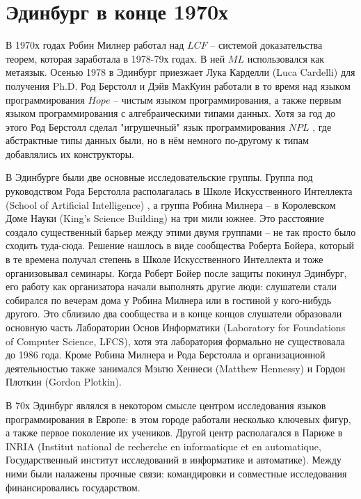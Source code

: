 \documentclass[14pt]{matmex-diploma-custom}
\begin{document}
\section{Эдинбург в конце 1970х}
В 1970х годах Робин Милнер работал над $LCF$ -- системой доказательства теорем, которая заработала в 1978-79х годах. В ней $M\!L$ использовался как метаязык. 
Осенью 1978 в Эдинбург приезжает Лука Карделли (Luca Cardelli) для получения Ph.D. Род Берстолл и Дэйв МакКуин работали в то время над языком программирования $Hope$ \cite{hope1} -- чистым языком программирования, а также первым языком программирования с алгебраическими типами данных. Хотя за год до этого Род Берстолл сделал "игрушечный" язык программирования $N\!P\!L$ \cite{npl1}, где абстрактные типы данных были, но в нём немного по-другому к типам добавлялись их конструкторы.

В Эдинбурге были две основные исследовательские группы. Группа под руководством Рода Берстолла располагалась в Школе Искусственного Интеллекта (School of Artificial Intelligence) 
, а группа Робина Милнера -- в Королевском Доме Науки (King’s Science Building) на три мили южнее. Это расстояние создало существенный барьер между этими двумя группами -- не так просто было сходить туда-сюда. Решение нашлось в виде сообщества Роберта Бойера, который в те времена получал степень в Школе Искусственного Интеллекта и тоже организовывал семинары.
Когда Роберт Бойер после защиты покинул Эдинбург, его работу как организатора начали выполнять другие люди: слушатели стали  собирался по вечерам дома у Робина Милнера  или в гостиной у кого-нибудь другого. Это сблизило два сообщества и в конце концов слушатели образовали основную часть Лаборатории Основ Информатики (Laboratory for Foundations of Computer Science, LFCS), хотя эта лаборатория формально не существовала до 1986 года.  Кроме Робина Милнера и Рода Берстолла и организационной деятельностью также занимался Мэьтю Хеннеси (Matthew Hennessy) и Гордон Плоткин (Gordon Plotkin).

В 70х Эдинбург являлся в некотором смысле центром исследования языков программирования в Европе: в этом городе работали несколько ключевых фигур, а также первое поколение их учеников. Другой центр располагался в Париже в INRIA (Institut national de recherche en informatique et en automatique, Государственный институт исследований в информатике и автоматике). Между ними были налажены прочные связи: командировки и совместные исследования финансировались государством.
\end{document}
